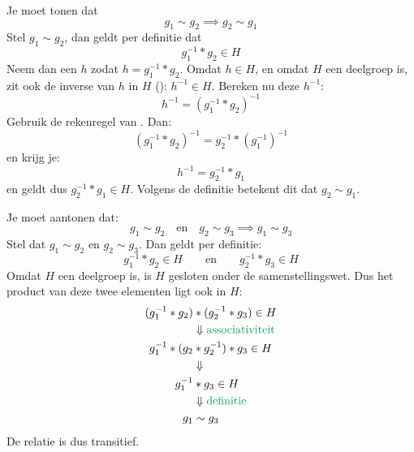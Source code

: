  Je moet tonen dat
\begin{equation*}
    g_1 \sim g_2 \implies g_2 \sim g_1
\end{equation*}
Stel $g_1 \sim g_2$, dan geldt per definitie dat
\begin{equation*}
    g_1^{-1} * g_2 \in H
\end{equation*}
Neem dan een $h$ zodat $h = g_1^{-1} * g_2$. Omdat $h \in H$, en omdat $H$ een deelgroep is, zit ook de inverse van $h$ in $H$ (): $h^{-1} \in H$. Bereken nu deze $h^{-1}$:
\begin{equation*}
    h^{-1} = (g_1^{-1} * g_2)^{-1}
\end{equation*}
Gebruik de rekenregel van . Dan:
\begin{equation*}
    (g_1^{-1} * g_2)^{-1} = g_2^{-1} * (g_1^{-1})^{-1}
\end{equation*}
en krijg je:
\begin{equation*}
    h^{-1} = g_2^{-1} * g_1
\end{equation*}
en geldt dus $g_2^{-1} * g_1 \in H$. Volgens de definitie betekent dit dat $g_2 \sim g_1$.

 Je moet aantonen dat:
\begin{equation*}
    g_1 \sim g_2 \quad \text{en} \quad g_2 \sim g_3 \implies g_1 \sim g_3
\end{equation*}
Stel dat $g_1 \sim g_2$ en $g_2 \sim g_3$. Dan geldt per definitie:
\begin{equation*}
    g_1^{-1} * g_2 \in H \qquad \text{en} \qquad g_2^{-1} * g_3 \in H
\end{equation*}
Omdat $H$ een deelgroep is, is $H$ gesloten onder de samenstellingswet. Dus het product van deze twee elementen ligt ook in $H$:
\begin{equation*}
    \begin{aligned}
        (g_1^{-1} * g_2) &* (g_2^{-1} * g_3) \in H \\
        &\Downarrow \textcolor{Green}{\text{associativiteit}} \\
        g_1^{-1} * (g_2 &* g_2^{-1}) * g_3 \in H \\
        &\Downarrow \\
        g_1^{-1} &* g_3 \in H \\
        &\Downarrow \textcolor{Green}{\text{definitie}} \\
        g_1 &\sim g_3
    \end{aligned}
\end{equation*}
De relatie is dus transitief.

